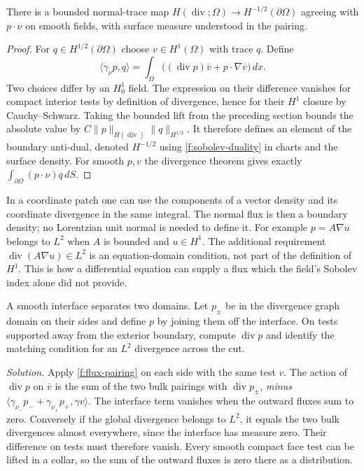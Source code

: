 \begin{proposition}\label{f:weak-flux}
There is a bounded normal-trace map $H(\operatorname{div};\Omega)\to H^{-1/2}(\partial\Omega)$ agreeing with $p\cdot\nu$ on smooth fields, with surface measure understood in the pairing.
\end{proposition}
\begin{proof}
For $q\in H^{1/2}(\partial\Omega)$ choose $v\in H^1(\Omega)$ with trace $q$. Define
\begin{equation}
 \langle\gamma_\nu p,q\rangle=\int_\Omega\big((\operatorname{div}p)\overline v+p\cdot\nabla\overline v\big)\,dx .\label{f:flux-pairing}
\end{equation}
Two choices differ by an $H^1_0$ field. The expression on their difference vanishes for compact interior tests by definition of divergence, hence for their $H^1$ closure by Cauchy--Schwarz. Taking the bounded lift from the preceding section bounds the absolute value by $C\|p\|_{H(\operatorname{div})}\|q\|_{H^{1/2}}$. It therefore defines an element of the boundary anti-dual, denoted $H^{-1/2}$ using \eqref{f:sobolev-duality} in charts and the surface density. For smooth $p,v$ the divergence theorem gives exactly $\int_{\partial\Omega}(p\cdot\nu)\overline q\,dS$.
\end{proof}

In a coordinate patch one can use the components of a vector density and its coordinate divergence in the same integral. The normal flux is then a boundary density; no Lorentzian unit normal is needed to define it. For example $p=A\nabla u$ belongs to $L^2$ when $A$ is bounded and $u\in H^1$. The additional requirement $\operatorname{div}(A\nabla u)\in L^2$ is an equation-domain condition, not part of the definition of $H^1$. This is how a differential equation can supply a flux which the field's Sobolev index alone did not provide.

\begin{exercise}
A smooth interface separates two domains. Let $p_\pm$ be in the divergence graph domain on their sides and define $p$ by joining them off the interface. On tests supported away from the exterior boundary, compute $\operatorname{div}p$ and identify the matching condition for an $L^2$ divergence across the cut.
\end{exercise}
\noindent\emph{Solution.} Apply \eqref{f:flux-pairing} on each side with the same test $v$. The action of $\operatorname{div}p$ on $\overline v$ is the sum of the two bulk pairings with $\operatorname{div}p_\pm$, \emph{minus} $\langle\gamma_{\nu_-}p_-+\gamma_{\nu_+}p_+,\gamma v\rangle$. The interface term vanishes when the outward fluxes sum to zero. Conversely if the global divergence belongs to $L^2$, it equals the two bulk divergences almost everywhere, since the interface has measure zero. Their difference on tests must therefore vanish. Every smooth compact face test can be lifted in a collar, so the sum of the outward fluxes is zero there as a distribution.
